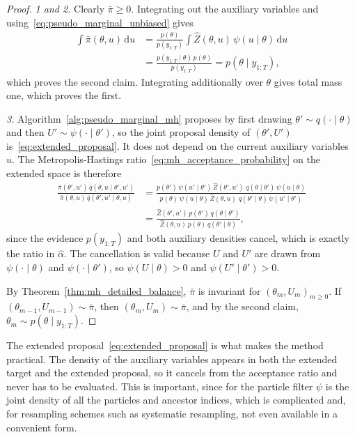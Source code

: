 \begin{proof}
    \emph{1 and 2.} Clearly $\bar{\pi}\ge 0$. Integrating out the auxiliary variables and using~\eqref{eq:pseudo_marginal_unbiased} gives
    \begin{align}
        \int \bar{\pi}(\theta,u)\,\mathrm{d}u &= \frac{p(\theta)}{p(y_{1:T})}\int \hat{Z}(\theta,u)\,\psi(u\mid\theta)\,\mathrm{d}u \\
        &= \frac{p(y_{1:T}\mid\theta)\,p(\theta)}{p(y_{1:T})} = p(\theta\mid y_{1:T}),
    \end{align}
    which proves the second claim. Integrating additionally over $\theta$ gives total mass one, which proves the first.

    \emph{3.} Algorithm~\ref{alg:pseudo_marginal_mh} proposes by first drawing $\theta'\sim q(\cdot\mid\theta)$ and then $U'\sim\psi(\cdot\mid\theta')$, so the joint proposal density of $(\theta',U')$ is~\eqref{eq:extended_proposal}. It does not depend on the current auxiliary variables $u$. The Metropolis-Hastings ratio~\eqref{eq:mh_acceptance_probability} on the extended space is therefore
    \begin{align}
        \frac{\bar{\pi}(\theta',u')\,\bar{q}(\theta,u\mid\theta',u')}{\bar{\pi}(\theta,u)\,\bar{q}(\theta',u'\mid\theta,u)}
        &= \frac{p(\theta')\,\psi(u'\mid\theta')\,\hat{Z}(\theta',u')\;q(\theta\mid\theta')\,\psi(u\mid\theta)}{p(\theta)\,\psi(u\mid\theta)\,\hat{Z}(\theta,u)\;q(\theta'\mid\theta)\,\psi(u'\mid\theta')} \\
        &= \frac{\hat{Z}(\theta',u')\,p(\theta')\,q(\theta\mid\theta')}{\hat{Z}(\theta,u)\,p(\theta)\,q(\theta'\mid\theta)},
    \end{align}
    since the evidence $p(y_{1:T})$ and both auxiliary densities cancel, which is exactly the ratio in $\hat{\alpha}$. The cancellation is valid because $U$ and $U'$ are drawn from $\psi(\cdot\mid\theta)$ and $\psi(\cdot\mid\theta')$, so $\psi(U\mid\theta)>0$ and $\psi(U'\mid\theta')>0$.

    By Theorem~\ref{thm:mh_detailed_balance}, $\bar{\pi}$ is invariant for $(\theta_m,U_m)_{m\ge 0}$. If $(\theta_{m-1},U_{m-1})\sim\bar{\pi}$, then $(\theta_m,U_m)\sim\bar{\pi}$, and by the second claim, $\theta_m\sim p(\theta\mid y_{1:T})$.
\end{proof}

The extended proposal~\eqref{eq:extended_proposal} is what makes the method practical. The density of the auxiliary variables appears in both the extended target and the extended proposal, so it cancels from the acceptance ratio and never has to be evaluated. This is important, since for the particle filter $\psi$ is the joint density of all the particles and ancestor indices, which is complicated and, for resampling schemes such as systematic resampling, not even available in a convenient form.

